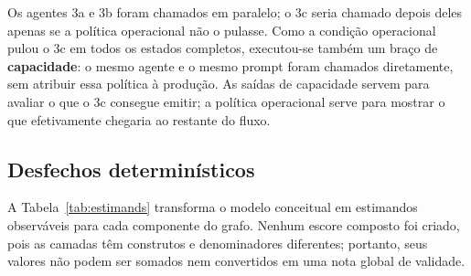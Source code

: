 \documentclass[11pt,a4paper]{article}
\begin{document}
Os agentes 3a e 3b foram chamados em paralelo; o 3c seria chamado depois deles apenas se a política operacional não o pulasse. Como a condição operacional pulou o 3c em todos os estados completos, executou-se também um braço de \textbf{capacidade}: o mesmo agente e o mesmo prompt foram chamados diretamente, sem atribuir essa política à produção. As saídas de capacidade servem para avaliar o que o 3c consegue emitir; a política operacional serve para mostrar o que efetivamente chegaria ao restante do fluxo.

\subsection{Desfechos determinísticos}

A Tabela~\ref{tab:estimands} transforma o modelo conceitual em estimandos observáveis para cada componente do grafo. Nenhum escore composto foi criado, pois as camadas têm construtos e denominadores diferentes; portanto, seus valores não podem ser somados nem convertidos em uma nota global de validade.
\end{document}
